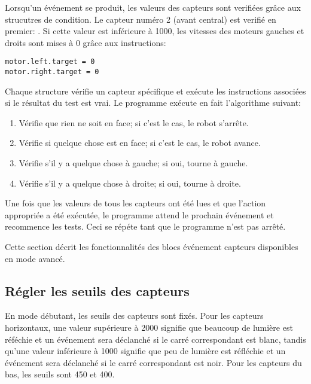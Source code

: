 Lorsqu'un événement se produit, les valeurs des capteurs sont verifiées grâce aux strucutres de condition.
Le capteur numéro 2 (avant central) est verifié en premier: .
Si cette valeur est inférieure à 1000, les vitesses des moteurs gauches et droits sont mises à 0
grâce aux instructions:

\begin{footnotesize}
\begin{verbatim}
motor.left.target = 0
motor.right.target = 0
\end{verbatim}
\end{footnotesize}

Chaque structure  vérifie un capteur spécifique et exécute les instructions
associées si le résultat du test est vrai.
Le programme exécute en fait l'algorithme suivant:

\begin{enumerate}[start=0,noitemsep,nosep]
\item Vérifie que rien ne soit en face; si c'est le cas, le robot s'arrête.
\item Vérifie si quelque chose est en face; si c'est le cas, le robot avance.
\item Vérifie s'il y a quelque chose à gauche; si oui, tourne à gauche.
\item Vérifie s'il y a quelque chose à droite; si oui, tourne à droite.
\end{enumerate}

Une fois que les valeurs de tous les capteurs ont été lues et que l'action appropriée a été exécutée,
le programme attend le prochain événement  et recommence les tests.
Ceci se répéte tant que le programme n'est pas arrêté.





Cette section décrit les fonctionnalités des blocs événement capteurs disponibles en mode avancé.

\subsection*{Régler les seuils des capteurs}

En mode débutant, les seuils des capteurs sont fixés.
Pour les capteurs horizontaux, une valeur supérieure à 2000 signifie que beaucoup de lumière
est réféchie et un événement sera déclanché si le carré correspondant est blanc,
tandis qu'une valeur inférieure à 1000 signifie que peu de lumière est réfléchie 
et un événement sera déclanché si le carré correspondant est noir.
Pour les capteurs du bas, les seuils sont 450 et 400.

